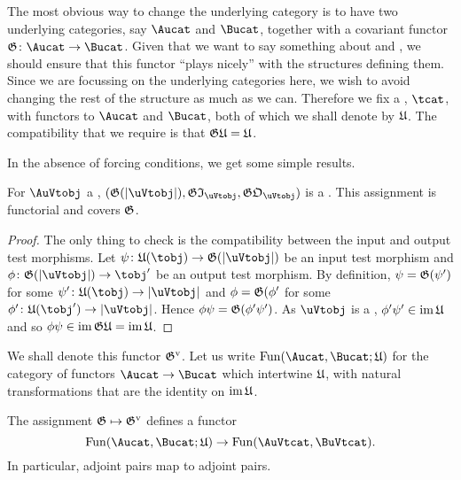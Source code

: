 \documentclass[%
a4paper,%
arxiv,%
defaults
]{myclass}
\begin{document}
The most obvious way to change the underlying category is to have two underlying categories, say \(\Aucat\) and \(\Bucat\), together with a covariant functor \(\subfunc \colon \Aucat \to \Bucat\).
Given that we want to say something about \uVtobjs and \uFVtobjs, we should ensure that this functor ``plays nicely'' with the structures defining them.
Since we are focussing on the underlying categories here, we wish to avoid changing the rest of the structure as much as we can.
Therefore we fix a \tcat, \(\tcat\), with functors to \(\Aucat\) and \(\Bucat\), both of which we shall denote by \(\ufunc\).
The compatibility that we require is that \(\subfunc \ufunc = \ufunc\).

In the absence of forcing conditions, we get some simple results.

\begin{proposition}
For \(\AuVtobj\) a \AuVtobj, \((\subfunc(\forfunc[\uVtobj]), \subfunc \itest_{\uVtobj}, \subfunc \otest_{\uVtobj})\) is a \BuVtobj.
This assignment is functorial and covers \(\subfunc\).
\end{proposition}

\begin{proof}
The only thing to check is the compatibility between the input and output test morphisms.
Let \(\ifn \colon \ufunc(\tobj) \to \subfunc(\forfunc[\uVtobj])\) be an input test morphism and \(\ofn \colon \subfunc(\forfunc[\uVtobj]) \to \tobj'\) be an output test morphism.
By definition, \(\ifn = \subfunc(\ifn')\) for some \(\ifn' \colon \ufunc(\tobj) \to \forfunc[\uVtobj]\) and \(\ofn = \subfunc(\ofn'\) for some \(\ofn' \colon \ufunc(\tobj') \to \forfunc[\uVtobj]\).
Hence \(\ofn \ifn = \subfunc(\ofn' \ifn')\).
As \(\uVtobj\) is a \uVtobj, \(\ofn' \ifn' \in \im \ufunc\) and so \(\ofn \ifn \in \im \subfunc \ufunc = \im \ufunc\).
\end{proof}

We shall denote this functor \(\mVo{\subfunc}\).
Let us write \(\Fun(\Aucat, \Bucat; \ufunc)\) for the category of functors \(\Aucat \to \Bucat\) which intertwine \(\ufunc\), with natural transformations that are the identity on \(\im \ufunc\).

\begin{corollary}
The assignment \(\subfunc \mapsto \mVo{\subfunc}\) defines a functor
%
\[
  \Fun(\Aucat, \Bucat; \ufunc) \to \Fun(\AuVtcat, \BuVtcat).
\]
%
In particular, adjoint pairs map to adjoint pairs. \noproof
\end{corollary}
\end{document}
